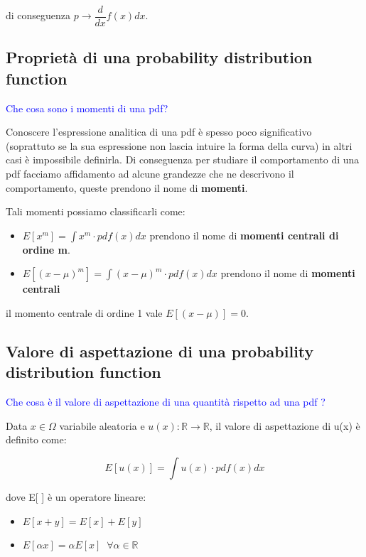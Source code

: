 \documentclass[11pt,a4paper]{book}
\begin{document}
\noindent di conseguenza $p \rightarrow \dfrac{d}{dx}f(x)dx$.

\subsection{Propriet\`{a} di una probability distribution function}
\textcolor{blue}{Che cosa sono i momenti di una pdf?}\newline

Conoscere l'espressione analitica di una pdf \`{e} spesso poco significativo (soprattuto se la sua espressione non lascia intuire la forma della curva) in altri casi \`{e} impossibile definirla. Di conseguenza per studiare il comportamento di una pdf facciamo affidamento ad alcune grandezze che ne descrivono il comportamento, queste prendono il nome di \textbf{momenti}.

Tali momenti possiamo classificarli come:

\begin{itemize}
	\item $E[x^m] = \int{x^m\cdot pdf(x)dx}$ prendono il nome di \textbf{momenti centrali di ordine m}.
	\item $E[(x-\mu)^m] = \int{(x-\mu)^m \cdot pdf(x)dx}$ prendono il nome di \textbf{momenti centrali}
\end{itemize}

il momento centrale di ordine 1 vale $E[(x-\mu)] = 0$.
\subsection{Valore di aspettazione di una probability distribution function}

\textcolor{blue}{Che cosa \`{e} il valore di aspettazione di una quantit\`{a} rispetto ad una pdf ?}

Data $x \in  \Omega $ variabile aleatoria e $u(x): \mathbb{R} \rightarrow \mathbb{R}$, il valore di aspettazione di u(x) \`{e} definito come:

\begin{equation}
	E[u(x)] = \int{u(x)\cdot pdf(x)dx}
\end{equation}

dove  E[ ] \`{e} un operatore lineare:

\begin{itemize}
	\item $E[x+y] = E[x] + E[y]$
	\item $E[\alpha x] = \alpha E[x] \;\; \forall \alpha \in \mathbb{R}$
\end{itemize}
\end{document}
